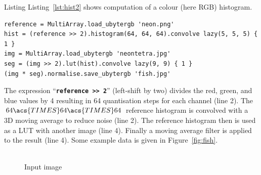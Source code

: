\documentclass[12pt,a4paper,oneside,openright]{book}
\newcommand{\fig}[1]{Figure~\ref{fig:#1}}
\newcommand{\lst}[1]{Listing~\ref{lst:#1}}
\newcommand{\code}[1]{``\texttt{\textbf{\textcolor{codegray}{\small{#1}}}}''}
\begin{document}
\begin{CJK}{UTF8}{}
Listing \lst{hist2} shows computation of a colour (here \ac{RGB}) histogram.
\lstset{language=Ruby,frame=single,numbers=left}
\begin{lstlisting}[float,caption={Histogram segmentation},label=lst:hist2]
reference = MultiArray.load_ubytergb 'neon.png'
hist = (reference >> 2).histogram(64, 64, 64).convolve lazy(5, 5, 5) { 1 }
img = MultiArray.load_ubytergb 'neontetra.jpg'
seg = (img >> 2).lut(hist).convolve lazy(9, 9) { 1 }
(img * seg).normalise.save_ubytergb 'fish.jpg'
\end{lstlisting}
The expression \code{reference >> 2} (left-shift by two) divides the \ac{red}, \ac{green}, and \ac{blue} values by 4 resulting in 64 quantisation steps for each channel (line 2). The $64\acs{TIMES} 64\acs{TIMES} 64$ reference histogram is convolved with a \ac{3D} moving average to reduce noise (line 2). The reference histogram then is used as a \ac{LUT} with another image (line 4). Finally a moving average filter is applied to the result (line 4). Some example data is given in \fig{fish}.
\begin{figure}[htbp]
  \begin{center}
    \begin{minipage}[c]{.42\textwidth}
      \begin{center}
        \\
        Input image
      \end{center}
    \end{minipage}
    \begin{minipage}[c]{.14\textwidth}
      \begin{center}
        \medskip\\

\end{center}
\end{minipage}
\end{center}
\end{figure}
\end{CJK}
\end{document}
